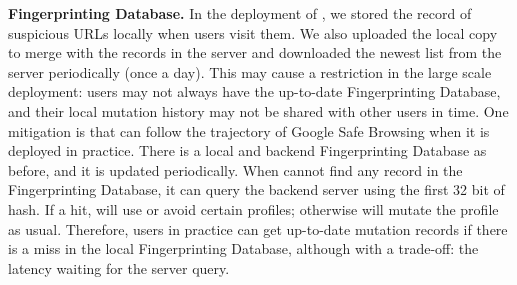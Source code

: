 \noindent
\textbf{Fingerprinting Database.}
In the deployment of \spartacus, we stored the record of suspicious URLs locally when users visit them.
We also uploaded the local copy to merge with the records in the server and downloaded the newest list from the server periodically (once a day).
This may cause a restriction in the large scale deployment: users may not always have the up-to-date Fingerprinting Database, and their local mutation history may not be shared with other users in time.
One mitigation is that \spartacus can follow the trajectory of Google Safe Browsing when it is deployed in practice.
There is a local and backend Fingerprinting Database as before, and it is updated periodically.
When \spartacus cannot find any record in the Fingerprinting Database, it can query the backend server using the first 32 bit of hash.
If a hit, \spartacus will use or avoid certain profiles;
otherwise \spartacus will mutate the profile as usual.
Therefore, users in practice can get up-to-date mutation records if there is a miss in the local Fingerprinting Database, although with a trade-off: the latency waiting for the server query.
